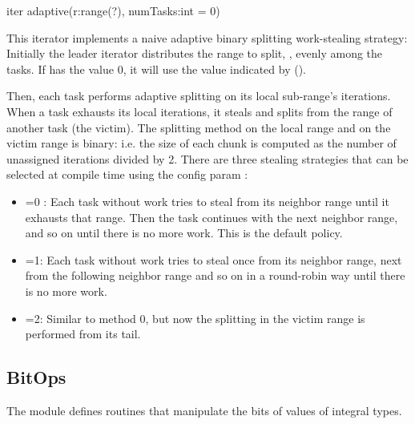 \begin{protohead}
iter adaptive(r:range(?), numTasks:int = 0)
\end{protohead}
\begin{protobody}
  This iterator implements a naive adaptive binary splitting
  work-stealing strategy: Initially the leader iterator distributes
  the range to split, , evenly among the 
  tasks.  If  has the value 0, it will use the value
  indicated by 
  ().

  Then, each task performs adaptive splitting on its local
  sub-range's iterations. When a task exhausts its local iterations,
  it steals and splits from the range of another task (the
  victim). The splitting method on the local range and on the victim
  range is binary: i.e. the size of each chunk is computed as the
  number of unassigned iterations divided by 2. There are three
  stealing strategies that can be selected at compile time using the
  config param :

\begin{itemize}

\item {}=0 : Each task without work tries to steal
  from its neighbor range until it exhausts that range. Then the task
  continues with the next neighbor range, and so on until there is no
  more work.  This is the default policy.

\item {}=1: Each task without work tries to steal
  once from its neighbor range, next from the following neighbor range
  and so on in a round-robin way until there is no more work.

\item {}=2: Similar to method 0, but now the
  splitting in the victim range is performed from its tail.
\end{itemize}

\end{protobody}


\subsection{BitOps}
\label{BitOps}

The module  defines routines that manipulate the bits of
values of integral types.

